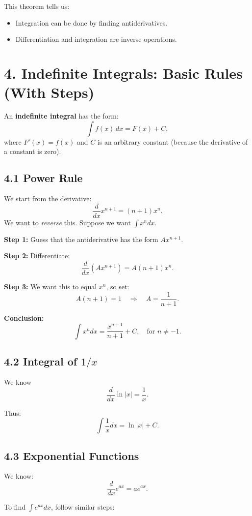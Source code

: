 \documentclass[12pt]{article}
\begin{document}
This theorem tells us:
\begin{itemize}
\item Integration can be done by finding antiderivatives.
\item Differentiation and integration are inverse operations.
\end{itemize}

\section*{4. Indefinite Integrals: Basic Rules (With Steps)}

An \textbf{indefinite integral} has the form:
\[
\int f(x)\, dx = F(x) + C,
\]
where $F'(x) = f(x)$ and $C$ is an arbitrary constant (because the derivative of a constant is zero).

\subsection*{4.1 Power Rule}

We start from the derivative:
\[
\frac{d}{dx}x^{n+1} = (n+1)x^n.
\]
We want to \emph{reverse} this. Suppose we want $\int x^n dx$.

\textbf{Step 1:} Guess that the antiderivative has the form $A x^{n+1}$.

\textbf{Step 2:} Differentiate:
\[
\frac{d}{dx} (A x^{n+1}) = A (n+1) x^n.
\]

\textbf{Step 3:} We want this to equal $x^n$, so set:
\[
A (n+1) = 1 \quad \Rightarrow \quad A = \frac{1}{n+1}.
\]

\textbf{Conclusion:}
\[
\int x^n dx = \frac{x^{n+1}}{n+1} + C, \quad \text{for } n\ne -1.
\]

\subsection*{4.2 Integral of $1/x$}

We know 
\[
\frac{d}{dx} \ln|x| = \frac{1}{x}.
\]

Thus:
\[
\int \frac{1}{x} dx = \ln|x| + C.
\]

\subsection*{4.3 Exponential Functions}

We know:
\[
\frac{d}{dx} e^{ax} = a e^{ax}.
\]

To find $\int e^{ax}dx$, follow similar steps:
\end{document}
